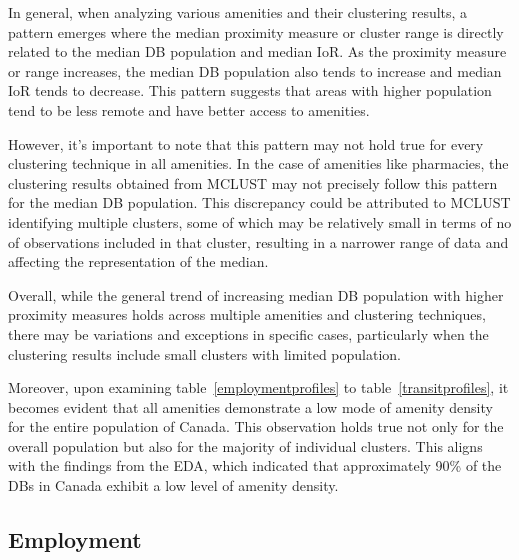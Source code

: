 \documentclass[11pt, a4paper]{article}
\begin{document}
In general, when analyzing various amenities and their clustering results, a pattern emerges where the median proximity measure or cluster range is directly related to the median DB population and median IoR. As the proximity measure or range increases, the median DB population also tends to increase and median IoR tends to decrease. This pattern suggests that areas with higher population tend to be less remote and have better access to amenities.
\par
However, it's important to note that this pattern may not hold true for every clustering technique in all amenities. In the case of amenities like pharmacies, the clustering results obtained from MCLUST may not precisely follow this pattern for the median DB population. This discrepancy could be attributed to MCLUST identifying multiple clusters, some of which may be relatively small in terms of no of observations included in that cluster, resulting in a narrower range of data and affecting the representation of the median.
\par
Overall, while the general trend of increasing median DB population with higher proximity measures holds across multiple amenities and clustering techniques, there may be variations and exceptions in specific cases, particularly when the clustering results include small clusters with limited population.
\par
Moreover, upon examining table~\ref{employmentprofiles} to table~\ref{transitprofiles}, it becomes evident that all amenities demonstrate a low mode of amenity density for the entire population of Canada. This observation holds true not only for the overall population but also for the majority of individual clusters. This aligns with the findings from the EDA, which indicated that approximately 90\% of the DBs in Canada exhibit a low level of amenity density.









\pagebreak
\subsection{Employment}
\end{document}
